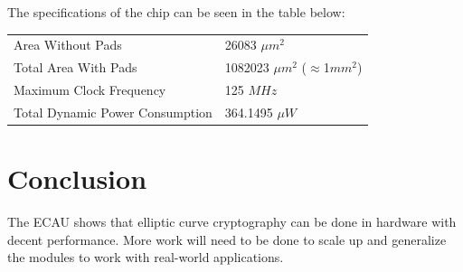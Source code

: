 \documentclass{IEEEtran}
\begin{document}
The specifications of the chip can be seen in the table below:

 \begin{tabular}{ l l }
  Area Without Pads & 26083 ${\mu}m^2$ \\
  Total Area With Pads & 1082023 ${\mu}m^2$ ($\approx$1$mm^2$) \\
  Maximum Clock Frequency & 125 $MHz$ \\
  Total Dynamic Power Consumption & 364.1495 ${\mu}W$\\
\end{tabular}

\section{Conclusion}
The ECAU shows that elliptic curve cryptography can be done in hardware with decent performance. More work will need to be done to scale up and generalize the modules to work with real-world applications. 



\end{document}
